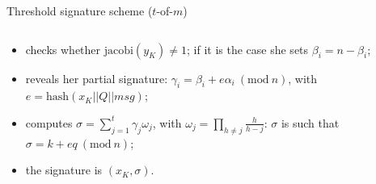 \documentclass[slidescentered]{beamer}
\begin{document}
\begin{frame}{Threshold signature scheme ($t$-of-$m$)}
\begin{columns}
\begin{column}{0.51\linewidth}
\begin{textblock*}{6cm}
{\begin{itemize}
					\item<20-23> checks whether $\text{jacobi}(y_K) \neq 1$; if it is the case she sets $\beta_i = n - \beta_i$;
					\item<21-23> reveals her partial signature: $\gamma_i  = \beta_i + e\alpha_i \ (\text{mod} \ n)$, with $e = \text{hash}(x_K||Q||msg)$;
					\item<22-23> computes $\sigma = \sum_{j = 1}^{t} \gamma_j\omega_j$, with $\omega_j = \prod_{h \neq j} \frac{h}{h - j}$: $\sigma$ is such that $\sigma = k + eq \ (\text{mod} \ n)$;
					\item<23> the signature is $(x_K, \sigma)$.
				\end{itemize}
			
			}
			\end{textblock*}
		
			\end{column}
			\begin{column}{0.65\linewidth}
				\begin{tikzpicture}[
					every node/.style = {%
					align=center}
					]	
				

\end{tikzpicture}
\end{column}
\end{columns}
\end{frame}
\end{document}
